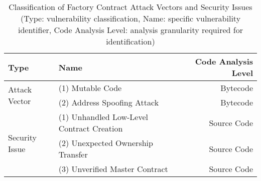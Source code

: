 \begin{table}[t]
	\centering
	\footnotesize
	\caption{Classification of Factory Contract Attack Vectors and Security Issues (Type:
		vulnerability classification, Name: specific vulnerability identifier, Code Analysis Level: analysis
	granularity required for identification)}
	\label{tab:attack-vector-security-issue}
	\begin{tabular}{@{}llr@{}}
			\toprule \textbf{Type}                   & \textbf{Name}                             & \textbf{Code Analysis Level} \\
		\midrule \multirow{2}{*}{Attack Vector}  & (1) Mutable Code                          & Bytecode            \\
		                                         & (2) Address Spoofing Attack               & Bytecode            \\
		\midrule \multirow{3}{*}{Security Issue} & (1) Unhandled Low-Level Contract Creation & Source Code         \\
		                                         & (2) Unexpected Ownership Transfer         & Source Code         \\
		                                         & (3) Unverified Master Contract            & Source Code         \\
		\bottomrule
	\end{tabular}
\end{table}
